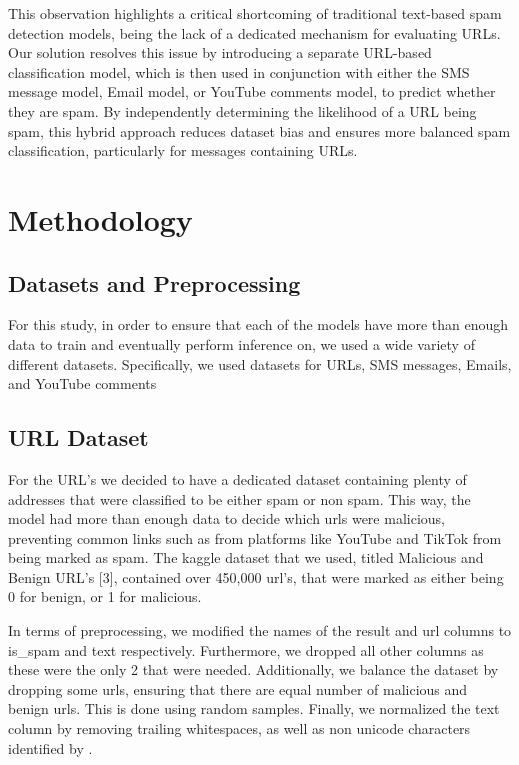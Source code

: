 \documentclass{article}
\begin{document}
\newline
\newline
This observation highlights a critical shortcoming of traditional text-based spam detection models, being the lack of a dedicated mechanism for evaluating URLs. Our solution resolves this issue by introducing a separate URL-based classification model, which is then used in conjunction with either the SMS message model, Email model, or YouTube comments model, to predict whether they are spam. By independently determining the likelihood of a URL being spam, this hybrid approach reduces dataset bias and ensures more balanced spam classification, particularly for messages containing URLs.	


\section{Methodology}


\subsection{Datasets and Preprocessing}

For this study, in order to ensure that each of the models have more than enough data to train and eventually perform inference on, we used a wide variety of different datasets. Specifically, we used datasets for URLs, SMS messages, Emails, and YouTube comments

\subsection*{URL Dataset}

For the URL’s we decided to have a dedicated dataset containing plenty of addresses that were classified to be either spam or non spam. This way, the model had more than enough data to decide which urls were malicious, preventing common links such as from platforms like YouTube and TikTok from being marked as spam. The kaggle dataset that we used, titled Malicious and Benign URL’s [3], contained over 450,000 url’s, that were marked as either being 0 for benign, or 1 for malicious. 


\noindent
In terms of preprocessing, we modified the names of the result and url columns to is\_spam and text respectively. Furthermore, we dropped all other columns as these were the only 2 that were needed. Additionally, we balance the dataset by dropping some urls, ensuring that there are equal number of malicious and benign urls. This is done using random samples. Finally, we normalized the text column by removing trailing whitespaces, as well as non unicode characters identified by \textquestiondown .
\end{document}
